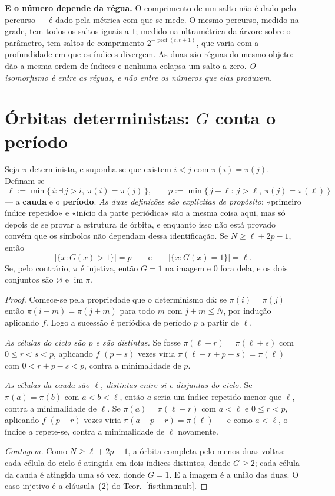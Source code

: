 \documentclass[livro.tex]{subfiles}
\begin{document}
\medskip\noindent\textbf{E o número depende da régua.} O comprimento de um salto
não é dado pelo percurso --- é dado pela métrica com que se mede. O mesmo
percurso, medido na grade, tem todos os saltos iguais a $1$; medido na
ultramétrica da árvore sobre o parâmetro, tem saltos de comprimento
$2^{-\operatorname{prof}(t,t+1)}$, que varia com a profundidade em que os índices
divergem. As duas são réguas do mesmo objeto: dão a mesma ordem de índices e
nenhuma colapsa um salto a zero. \emph{O isomorfismo é entre as réguas, e não
entre os números que elas produzem.}


\section{Órbitas deterministas: $G$ conta o período}\label{fis:periodo}

\begin{teorema}\label{fis:thm:periodo}
Seja $\pi$ determinista, e suponha-se que existem $i<j$ com $\pi(i)=\pi(j)$.
Definam-se
\[
\boxed{\;
\ell:=\min\{\,i:\exists\,j>i,\ \pi(i)=\pi(j)\,\},
\qquad
p:=\min\{\,j-\ell:\ j>\ell,\ \pi(j)=\pi(\ell)\,\}\;}
\]
--- a \textbf{cauda} e o \textbf{período}. \emph{As duas definições são
explícitas de propósito}: «primeiro índice repetido» e «início da parte
periódica» são a mesma coisa aqui, mas só depois de se provar a estrutura de
órbita, e enquanto isso não está provado convém que os símbolos não dependam
dessa identificação. Se $N\ge\ell+2p-1$, então
\[
\bigl\lvert\{x: G(x)>1\}\bigr\rvert=p
\qquad\text{e}\qquad
\bigl\lvert\{x: G(x)=1\}\bigr\rvert=\ell .
\]
Se, pelo contrário, $\pi$ é injetiva, então $G=1$ na imagem e $0$ fora dela, e os
dois conjuntos são $\varnothing$ e $\operatorname{im}\pi$.
\end{teorema}

\begin{proof}
Comece-se pela propriedade que o determinismo dá: se $\pi(i)=\pi(j)$ então
$\pi(i+m)=\pi(j+m)$ para todo $m$ com $j+m\le N$, por indução aplicando $f$. Logo
a sucessão é periódica de período $p$ a partir de $\ell$.

\emph{As células do ciclo são $p$ e são distintas.} Se fosse
$\pi(\ell+r)=\pi(\ell+s)$ com $0\le r<s<p$, aplicando $f$ $(p-s)$ vezes viria
$\pi(\ell+r+p-s)=\pi(\ell)$ com $0<r+p-s<p$, contra a minimalidade de $p$.

\emph{As células da cauda são $\ell$, distintas entre si e disjuntas do ciclo.} Se
$\pi(a)=\pi(b)$ com $a<b<\ell$, então $a$ seria um índice repetido menor que
$\ell$, contra a minimalidade de $\ell$. Se $\pi(a)=\pi(\ell+r)$ com $a<\ell$ e
$0\le r<p$, aplicando $f$ $(p-r)$ vezes viria $\pi(a+p-r)=\pi(\ell)$ --- e como
$a<\ell$, o índice $a$ repete-se, contra a minimalidade de $\ell$ novamente.

\emph{Contagem.} Como $N\ge\ell+2p-1$, a órbita completa pelo menos duas voltas:
cada célula do ciclo é atingida em dois índices distintos, donde $G\ge2$; cada
célula da cauda é atingida uma só vez, donde $G=1$. E a imagem é a união das
duas. O caso injetivo é a cláusula~(2) do Teor.~\ref{fis:thm:mult}.
\end{proof}
\end{document}
